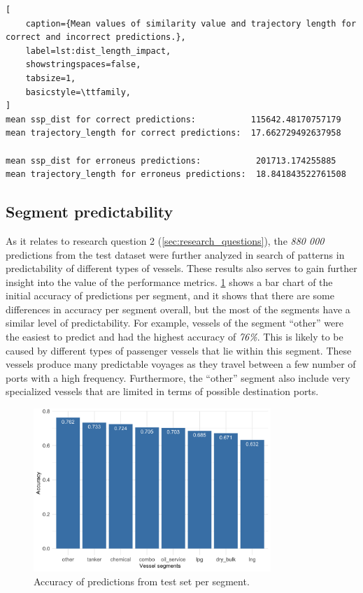 \begin{lstlisting}[
    caption={Mean values of similarity value and trajectory length for correct and incorrect predictions.},
    label=lst:dist_length_impact,
    showstringspaces=false,
    tabsize=1,
    basicstyle=\ttfamily,
]
mean ssp_dist for correct predictions:           115642.48170757179
mean trajectory_length for correct predictions:  17.662729492637958

mean ssp_dist for erroneus predictions:           201713.174255885
mean trajectory_length for erroneus predictions:  18.841843522761508
\end{lstlisting}

\subsection{Segment predictability}

As it relates to research question 2 (\cref{sec:research_questions}), the \textit{880 000} predictions from the test dataset were further analyzed in search of patterns in predictability of different types of vessels. These results also serves to gain further insight into the value of the performance metrics. \cref{fig:segment_accuracy} shows a bar chart of the initial accuracy of predictions per segment, and it shows that there are some differences in accuracy per segment overall, but the most of the segments have a similar level of predictability. For example, vessels of the segment ``other'' were the easiest to predict and had the highest accuracy of \textit{76\%}. This is likely to be caused by different types of passenger vessels that lie within this segment. These vessels produce many predictable voyages as they travel between a few number of ports with a high frequency. Furthermore, the ``other'' segment also include very specialized vessels that are limited in terms of possible destination ports.

\begin{figure}[htbp]
    \centering
    \includegraphics[width=0.8\textwidth]{figures/results/segment_accuracy_new}
    \caption{Accuracy of predictions from test set per segment.}
    \label{fig:segment_accuracy}
\end{figure}

